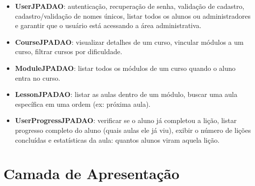 \begin{itemize}
	\item \textbf{UserJPADAO}: autenticação, recuperação de senha, validação de cadastro, cadastro/validação de nomes únicos, listar todos os alunos ou administradores e garantir que o usuário está acessando a área administrativa.
	
	\item \textbf{CourseJPADAO}: visualizar detalhes de um curso, vincular módulos a um curso, filtrar cursos por dificuldade.
	
	\item \textbf{ModuleJPADAO}: listar todos os módulos de um curso quando o aluno entra no curso.
	
	\item \textbf{LessonJPADAO}: listar as aulas dentro de um módulo, buscar uma aula específica em uma ordem (ex: próxima aula).
	
	\item \textbf{UserProgressJPADAO}: verificar se o aluno já completou a lição, listar progresso completo do aluno (quais aulas ele já viu), exibir o número de lições concluídas e estatísticas da aula: quantos alunos viram aquela lição.
\end{itemize}

\section{Camada de Apresentação}
\label{sec-frameweb-apresentacao}



